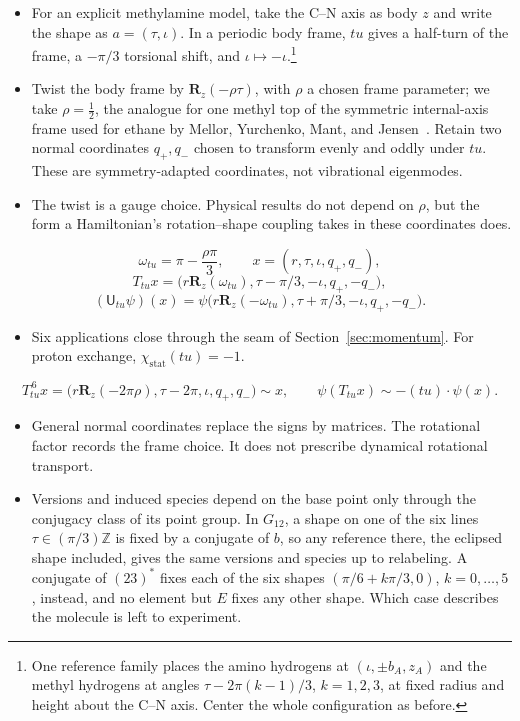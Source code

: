 \documentclass[11pt]{article}
\newcommand{\act}{\mathbin{\cdot}}
\newcommand{\stat}{\chi_{\mathrm{stat}}}
\newcommand{\Rmat}{\mathbf{R}}
\newcommand{\Uop}{\mathsf{U}}
\begin{document}
\begin{itemize}
\item For an explicit methylamine model, take the C--N axis as body $z$
and write the shape as $a=(\tau,\iota)$. In a periodic body frame,
$tu$ gives a half-turn of the frame, a $-\pi/3$ torsional shift,
and $\iota\mapsto-\iota$.\footnote{One reference family places the amino
hydrogens at $(\iota,\pm b_A,z_A)$ and the methyl hydrogens at angles
$\tau-2\pi(k-1)/3$, $k=1,2,3$, at fixed radius and height about
the C--N axis. Center the whole configuration as before.}
\item Twist the body frame by $\Rmat_z(-\rho\tau)$, with $\rho$ a chosen
frame parameter; we take $\rho=\frac12$, the analogue for one methyl top of
the symmetric internal-axis frame used for ethane by Mellor, Yurchenko, Mant,
and Jensen~\cite{MellorEtAl2019}. Retain two normal
coordinates $q_+,q_-$ chosen to transform evenly and oddly under $tu$.
These are symmetry-adapted coordinates, not vibrational eigenmodes.
\item The twist is a gauge choice. Physical results do not depend on $\rho$, but the form a Hamiltonian's
rotation--shape coupling takes in these coordinates does.
\end{itemize}
\[
\omega_{tu}=\pi-\frac{\rho\pi}{3},\qquad
x=(r,\tau,\iota,q_+,q_-),
\]
\[
T_{tu}x=\bigl(r\Rmat_z(\omega_{tu}),\tau-\pi/3,-\iota,q_+,-q_-\bigr),
\]
\[
(\Uop_{tu}\psi)(x)
=\psi\bigl(r\Rmat_z(-\omega_{tu}),\tau+\pi/3,-\iota,q_+,-q_-\bigr).
\]
\begin{itemize}
\item Six applications close through the seam of Section~\ref{sec:momentum}.
For proton exchange, $\stat(tu)=-1$.
\end{itemize}
\[
T_{tu}^{\,6}x
=\bigl(r\Rmat_z(-2\pi\rho),\tau-2\pi,\iota,q_+,q_-\bigr)\sim x,
\qquad \psi(T_{tu}x)\sim-(tu)\act\psi(x).
\]
\begin{itemize}
\item General normal coordinates replace the signs by matrices.
The rotational factor records the frame choice. It does not prescribe
dynamical rotational transport.
\item Versions and induced species depend on the base point only through the conjugacy class of its point
group. In $G_{12}$, a shape on one of the six lines $\tau\in(\pi/3)\mathbb Z$ is fixed by a conjugate of
$b$, so any reference there, the eclipsed shape included, gives the same versions and species up to
relabeling. A conjugate of $(23)^*$ fixes each of the six shapes $(\pi/6+k\pi/3,0)$,
$k=0,\ldots,5$, instead, and
no element but $E$ fixes any other shape. Which case describes the molecule is left to experiment.
\end{itemize}
\end{document}
